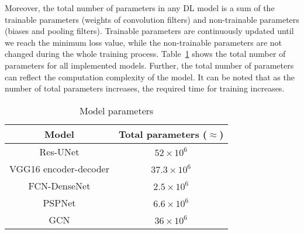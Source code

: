 Moreover, the total number of parameters in any DL model is a sum of the trainable parameters (weights of convolution filters) and non-trainable parameters (biases and pooling filters).
Trainable parameters are continuously updated until we reach the minimum loss value, while the non-trainable parameters are not changed during the whole training process.
Table~\ref{tab:table_parameters} shows the total number of parameters for all implemented models.
Further, the total number of parameters can reflect the computation complexity of the model.
It can be noted that as the number of total parameters increases, the required time for training increases.
\begin{table}[]
	\centering
	\caption{Model parameters}
	\label{tab:table_parameters}
		\begin{tabular}{cc}\hline
			Model &  Total parameters (\(\approx\)) \\ \hline
			Res-UNet & \(52\times 10^6\) \\ 
			VGG16 encoder-decoder & \(37.3\times 10^6\)  \\
			FCN-DenseNet & \(2.5\times 10^6\) \\ 
			PSPNet & \(6.6\times 10^6\) \\ 
			GCN & \(36\times 10^6\) \\ \hline
		\end{tabular}
\end{table}
